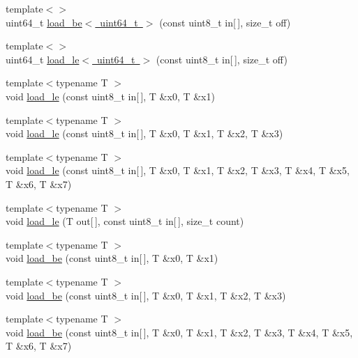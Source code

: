 \begin{DoxyCompactItemize}
\item 
{\footnotesize template$<$$>$ }\\uint64\+\_\+t \mbox{\hyperlink{namespace_botan_a96d5556307d65f0974740f8c3fc33639}{load\+\_\+be$<$ uint64\+\_\+t $>$}} (const uint8\+\_\+t in\mbox{[}$\,$\mbox{]}, size\+\_\+t off)
\item 
{\footnotesize template$<$$>$ }\\uint64\+\_\+t \mbox{\hyperlink{namespace_botan_af8e343d945901fa17325279d27a14e39}{load\+\_\+le$<$ uint64\+\_\+t $>$}} (const uint8\+\_\+t in\mbox{[}$\,$\mbox{]}, size\+\_\+t off)
\item 
{\footnotesize template$<$typename T $>$ }\\void \mbox{\hyperlink{namespace_botan_abb60b6e5af3132bc5095cfcbaa90fc35}{load\+\_\+le}} (const uint8\+\_\+t in\mbox{[}$\,$\mbox{]}, T \&x0, T \&x1)
\item 
{\footnotesize template$<$typename T $>$ }\\void \mbox{\hyperlink{namespace_botan_a03b8aebd623614ee2d8804bb82b96928}{load\+\_\+le}} (const uint8\+\_\+t in\mbox{[}$\,$\mbox{]}, T \&x0, T \&x1, T \&x2, T \&x3)
\item 
{\footnotesize template$<$typename T $>$ }\\void \mbox{\hyperlink{namespace_botan_a170a82161413e005b53c3db27d79678e}{load\+\_\+le}} (const uint8\+\_\+t in\mbox{[}$\,$\mbox{]}, T \&x0, T \&x1, T \&x2, T \&x3, T \&x4, T \&x5, T \&x6, T \&x7)
\item 
{\footnotesize template$<$typename T $>$ }\\void \mbox{\hyperlink{namespace_botan_a42d83d9e349598b56af765a1acb441bc}{load\+\_\+le}} (T out\mbox{[}$\,$\mbox{]}, const uint8\+\_\+t in\mbox{[}$\,$\mbox{]}, size\+\_\+t count)
\item 
{\footnotesize template$<$typename T $>$ }\\void \mbox{\hyperlink{namespace_botan_a5773c133cf22abd1269664b59c16244a}{load\+\_\+be}} (const uint8\+\_\+t in\mbox{[}$\,$\mbox{]}, T \&x0, T \&x1)
\item 
{\footnotesize template$<$typename T $>$ }\\void \mbox{\hyperlink{namespace_botan_a0b0c4a782d518167985566686e4d1a95}{load\+\_\+be}} (const uint8\+\_\+t in\mbox{[}$\,$\mbox{]}, T \&x0, T \&x1, T \&x2, T \&x3)
\item 
{\footnotesize template$<$typename T $>$ }\\void \mbox{\hyperlink{namespace_botan_a996923074c3867c0f2ce1d1b96b8fd4b}{load\+\_\+be}} (const uint8\+\_\+t in\mbox{[}$\,$\mbox{]}, T \&x0, T \&x1, T \&x2, T \&x3, T \&x4, T \&x5, T \&x6, T \&x7)

\end{DoxyCompactItemize}
